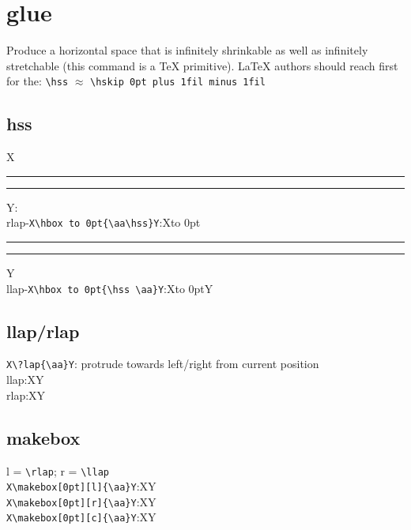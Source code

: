 \documentclass{article}
\def\aa{{\color{red}\rule{7.5pt}{2pt}}{\color{blue}\rule{7.5pt}{2pt}}}
\begin{document}
\section{glue}
Produce a horizontal space that is infinitely shrinkable as well as 
infinitely stretchable (this command is a \TeX{} primitive). \LaTeX{} 
authors should reach first for the: \verb|\hss| $\approx$ \verb|\hskip 0pt plus 1fil minus 1fil|

\subsection{hss}
X\aa{}Y:\\
rlap-\verb|X\hbox to 0pt{\aa\hss}Y|:\quad X\hbox to 0pt{\aa\hss}Y\\
llap-\verb|X\hbox to 0pt{\hss \aa}Y|:\quad X\hbox to 0pt{\hss \aa}Y

\subsection{llap/rlap}
\verb|X\?lap{\aa}Y|: protrude towards left/right from current position\\
llap:\quad X\llap{\aa}Y\\
rlap:\quad X\rlap{\aa}Y

\subsection{makebox}
l = \verb|\rlap|; r = \verb|\llap|\\
\verb|X\makebox[0pt][l]{\aa}Y|:\quad X\makebox[0pt][l]{\aa}Y\\
\verb|X\makebox[0pt][r]{\aa}Y|:\quad X\makebox[0pt][r]{\aa}Y\\
\verb|X\makebox[0pt][c]{\aa}Y|:\quad X\makebox[0pt][c]{\aa}Y
\end{document}
